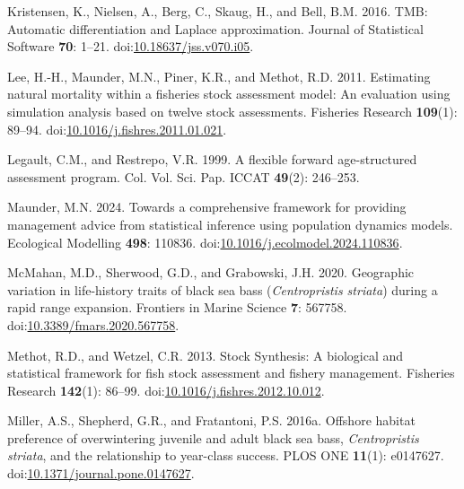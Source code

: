 \documentclass[
]{article}
\newlength{\cslhangindent}
\newlength{\cslentryspacingunit} %
\newenvironment{CSLReferences}[2] %
 {%
  \setlength{\parindent}{0pt}
  \ifodd #1
  \let\oldpar\par
  \def\par{\hangindent=\cslhangindent\oldpar}
  \fi
  \setlength{\parskip}{#2\cslentryspacingunit}
 }%
 {}
\begin{document}
\begin{CSLReferences}{1}{0}
\leavevmode{}%
Kristensen, K., Nielsen, A., Berg, C., Skaug, H., and Bell, B.M. 2016. {TMB}: Automatic differentiation and {Laplace} approximation. Journal of Statistical Software \textbf{70}: 1--21. doi:\href{https://doi.org/10.18637/jss.v070.i05}{10.18637/jss.v070.i05}.

\leavevmode{}%
Lee, H.-H., Maunder, M.N., Piner, K.R., and Methot, R.D. 2011. Estimating natural mortality within a fisheries stock assessment model: An evaluation using simulation analysis based on twelve stock assessments. Fisheries Research \textbf{109}(1): 89--94. doi:\href{https://doi.org/10.1016/j.fishres.2011.01.021}{10.1016/j.fishres.2011.01.021}.

\leavevmode{}%
Legault, C.M., and Restrepo, V.R. 1999. A flexible forward age-structured assessment program. Col. Vol. Sci. Pap. ICCAT \textbf{49}(2): 246--253.

\leavevmode{}%
Maunder, M.N. 2024. Towards a comprehensive framework for providing management advice from statistical inference using population dynamics models. Ecological Modelling \textbf{498}: 110836. doi:\href{https://doi.org/10.1016/j.ecolmodel.2024.110836}{10.1016/j.ecolmodel.2024.110836}.

\leavevmode{}%
McMahan, M.D., Sherwood, G.D., and Grabowski, J.H. 2020. Geographic variation in life-history traits of black sea bass (\emph{{C}entropristis striata}) during a rapid range expansion. Frontiers in Marine Science \textbf{7}: 567758. doi:\href{https://doi.org/10.3389/fmars.2020.567758}{10.3389/fmars.2020.567758}.

\leavevmode{}%
Methot, R.D., and Wetzel, C.R. 2013. Stock {S}ynthesis: A biological and statistical framework for fish stock assessment and fishery management. Fisheries Research \textbf{142}(1): 86--99. doi:\href{https://doi.org/10.1016/j.fishres.2012.10.012}{10.1016/j.fishres.2012.10.012}.

\leavevmode{}%
Miller, A.S., Shepherd, G.R., and Fratantoni, P.S. 2016a. Offshore habitat preference of overwintering juvenile and adult black sea bass, \emph{{C}entropristis} \emph{striata}, and the relationship to year-class success. {PLOS} {ONE} \textbf{11}(1): e0147627. doi:\href{https://doi.org/10.1371/journal.pone.0147627}{10.1371/journal.pone.0147627}.


\end{CSLReferences}
\end{document}
